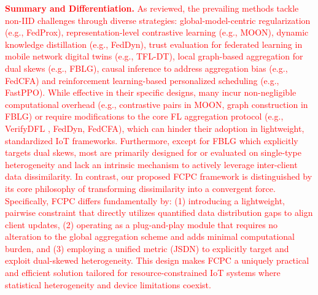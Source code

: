\documentclass[journal,twoside,web]{ieeecolor}
\newcommand{\rev}[1]{\textcolor{red}{#1}}
\begin{document}
\rev{\textbf{Summary and Differentiation. }As reviewed, the prevailing methods tackle non-IID challenges through diverse strategies: global-model-centric regularization (e.g., FedProx), representation-level contrastive learning (e.g., MOON), dynamic knowledge distillation (e.g., FedDyn), trust evaluation for federated learning in mobile network digital twins (e.g., TFL-DT\cite{tfl-dt}), local graph-based aggregation for dual skews (e.g., FBLG\cite{fblg}), causal inference to address aggregation bias (e.g., FedCFA\cite{fedcfa}) and reinforcement learning-based personalized scheduling (e.g., FastPPO). While effective in their specific designs, many incur non-negligible computational overhead (e.g., contrastive pairs in MOON, graph construction in FBLG) or require modifications to the core FL aggregation protocol (e.g., VerifyDFL \cite{majianfeng}, FedDyn, FedCFA), which can hinder their adoption in lightweight, standardized IoT frameworks. Furthermore, except for FBLG which explicitly targets dual skews, most are primarily designed for or evaluated on single-type heterogeneity and lack an intrinsic mechanism to actively leverage inter-client data dissimilarity. In contrast, our proposed FCPC framework is distinguished by its core philosophy of transforming dissimilarity into a convergent force. Specifically, FCPC differs fundamentally by: (1) introducing a lightweight, pairwise constraint that directly utilizes quantified data distribution gaps  to align client updates, (2) operating as a plug-and-play module that requires no alteration to the global aggregation scheme and adds minimal computational burden, and (3) employing a unified metric (JSDN) to explicitly target and exploit dual-skewed heterogeneity. This design makes FCPC a uniquely practical and efficient solution tailored for resource-constrained IoT systems where statistical heterogeneity and device limitations coexist.}


\end{document}
